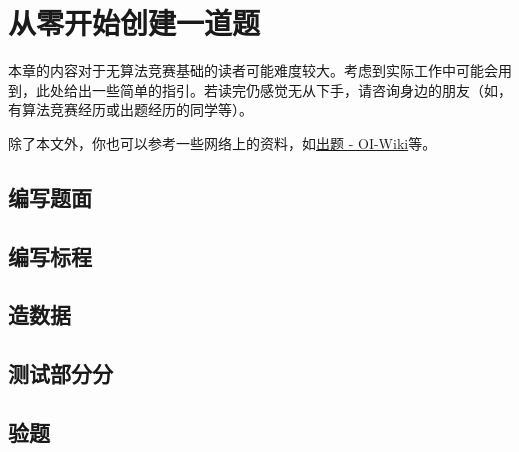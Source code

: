 \documentclass[oneside]{book}
\begin{document}
\chapter{从零开始创建一道题}

\label{chap:create_problem}

本章的内容对于无算法竞赛基础的读者可能难度较大。考虑到实际工作中可能会用到，此处给出一些简单的指引。若读完仍感觉无从下手，请咨询身边的朋友（如，有算法竞赛经历或出题经历的同学等）。

除了本文外，你也可以参考一些网络上的资料，如\href{https://oi-wiki.org/contest/problemsetting/}{出题 - OI-Wiki}等。


\section{编写题面}

\section{编写标程}

\section{造数据}

\label{sec:generating_data}

\section{测试部分分}

\section{验题}

\label{sec:verify_problem}
\end{document}
